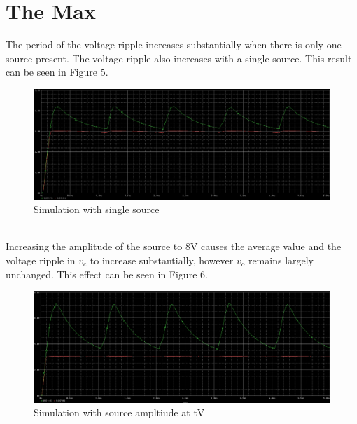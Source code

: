 \documentclass[12pt]{article}
\begin{document}
\section*{The Max}
The period of the voltage ripple increases substantially when there is only one source present. The voltage ripple also increases with a single source. This result can be seen in Figure 5.
\begin{figure}[h!]
    \centering
    \includegraphics[width=\textwidth]{C1.png}
    \caption{Simulation with single source}
\end{figure} \\
\pagebreak
Increasing the amplitude of the source to 8V causes the average value and the voltage ripple in $v_c$ to increase substantially, however $v_o$ remains largely unchanged. This effect can be seen in Figure 6.
\begin{figure}[h!]
    \centering
    \includegraphics[width=\textwidth]{C2.png}
    \caption{Simulation with source ampltiude at tV}
\end{figure}
\end{document}
